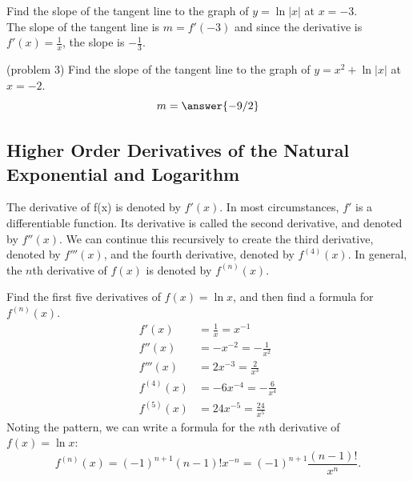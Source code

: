 \documentclass[handout]{ximera}
\begin{document}
\begin{example}[example 3]
Find the slope of the tangent line to the graph of $y = \ln|x|$ at $x = -3$.\\
The slope of the tangent line is $m = f'(-3)$ and since the derivative is $f'(x) = \frac{1}{x}$,
the slope is $-\frac13$.
\end{example}
 
\begin{problem}(problem 3)
Find the slope of the tangent line to the graph of $y= x^2 + \ln|x|$ at $x = -2$.
\[
m = \answer{-9/2}
\]
\end{problem}
 
  
\begin{foldable}
\end{foldable}

\subsection{Higher Order Derivatives of the Natural Exponential and Logarithm}

The derivative of f(x) is denoted by $f'(x)$. In most circumstances, $f'$ is a differentiable function. Its derivative is called
 the second derivative, and denoted by $f''(x)$. 
 We can continue this recursively to create the third derivative, denoted by $f'''(x)$, and the fourth derivative, 
 denoted by $f^{(4)}(x)$.  In general, the $n$th derivative of $f(x)$ is denoted by $f^{(n)}(x)$. 

\begin{example}[example 4]
Find the first five derivatives of $f(x) = \ln x$, and then find a formula for $f^{(n)}(x)$.\\
\begin{align*}
f'(x) &= \frac{1}{x} = x^{-1}\\
f''(x) &= -x^{-2} = -\frac{1}{x^2}\\
f'''(x) &= 2x^{-3} = \frac{2}{x^3}\\
f^{(4)}(x) &= -6x^{-4} = -\frac{6}{x^4}\\
f^{(5)}(x) &= 24x^{-5} = \frac{24}{x^5}
\end{align*}  
Noting the pattern, we can write a formula for the $n$th derivative of $f(x) = \ln x$:
\[
f^{(n)}(x) = (-1)^{n+1}(n-1)!x^{-n} = (-1)^{n+1}\frac{(n-1)!}{x^n}.
\]
\end{example}
\end{document}
